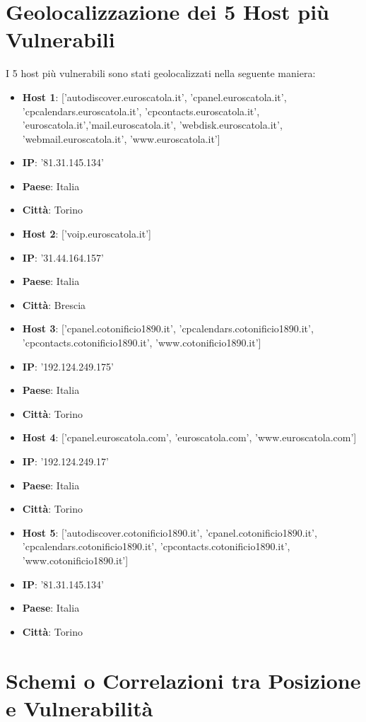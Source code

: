 \section{Geolocalizzazione dei 5 Host più Vulnerabili}

I 5 host più vulnerabili sono stati geolocalizzati nella seguente maniera:
\begin{itemize}
\item \textbf{Host 1}: ['autodiscover.euroscatola.it', 'cpanel.euroscatola.it', 'cpcalendars.euroscatola.it', 'cpcontacts.euroscatola.it', 'euroscatola.it','mail.euroscatola.it', 'webdisk.euroscatola.it', 'webmail.euroscatola.it', 'www.euroscatola.it']
\item \textbf{IP}: '81.31.145.134'
\item \textbf{Paese}: Italia
\item \textbf{Città}: Torino
\item \textbf{Host 2}: ['voip.euroscatola.it']
\item \textbf{IP}: '31.44.164.157'
\item \textbf{Paese}: Italia
\item \textbf{Città}: Brescia
\item \textbf{Host 3}: ['cpanel.cotonificio1890.it', 'cpcalendars.cotonificio1890.it', 'cpcontacts.cotonificio1890.it', 'www.cotonificio1890.it']
\item \textbf{IP}: '192.124.249.175'
\item \textbf{Paese}: Italia
\item \textbf{Città}: Torino
\item \textbf{Host 4}: ['cpanel.euroscatola.com', 'euroscatola.com', 'www.euroscatola.com']
\item \textbf{IP}: '192.124.249.17'
\item \textbf{Paese}: Italia
\item \textbf{Città}: Torino
\item \textbf{Host 5}: ['autodiscover.cotonificio1890.it', 'cpanel.cotonificio1890.it', 'cpcalendars.cotonificio1890.it', 'cpcontacts.cotonificio1890.it', 'www.cotonificio1890.it']
\item \textbf{IP}: '81.31.145.134'
\item \textbf{Paese}: Italia
\item \textbf{Città}: Torino
\end{itemize}
\section{Schemi o Correlazioni tra Posizione e Vulnerabilità}

